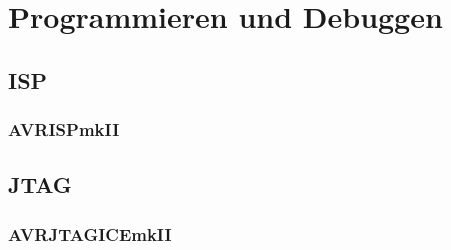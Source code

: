 \chapter{Programmieren und Debuggen}

\section{ISP}

\subsection{AVRISPmkII}

\section{JTAG}

\subsection{AVRJTAGICEmkII}